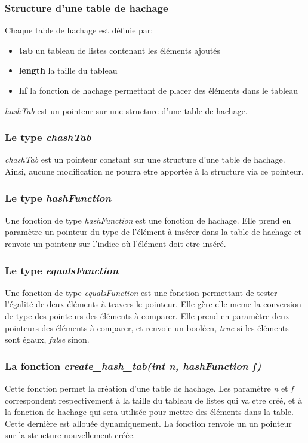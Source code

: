 \documentclass{report}
\begin{document}
\subsubsection*{Structure d'une table de hachage}
Chaque table de hachage est définie par:
\begin{itemize}
\item \textbf{tab} un tableau de listes contenant les éléments ajoutés
\item \textbf{length} la taille du tableau
\item \textbf{hf} la fonction de hachage permettant de placer des éléments dans le tableau
\end{itemize}
\textit{hashTab} est un pointeur sur une structure d'une table de hachage.
\subsubsection*{Le type \textit{chashTab}}
\textit{chashTab} est un pointeur constant sur une structure d'une table de hachage. Ainsi, aucune modification ne pourra etre apportée à la structure via ce pointeur.
\subsubsection*{Le type \textit{hashFunction}}
Une fonction de type \textit{hashFunction} est une fonction de hachage. Elle prend en paramètre un pointeur du type de l'élément à insérer dans la table de hachage et renvoie un pointeur sur l'indice où l'élément doit etre inséré.
\subsubsection*{Le type \textit{equalsFunction}}
Une fonction de type \textit{equalsFunction} est une fonction permettant de tester l'égalité de deux éléments à travers le pointeur. Elle gère elle-meme la conversion de type des pointeurs des éléments à comparer. Elle prend en paramètre deux pointeurs des éléments à comparer, et renvoie un booléen, \textit{true} si les éléments sont égaux, \textit{false} sinon.
\subsubsection*{La fonction \textit{create\_hash\_tab(int n, hashFunction f)}}
Cette fonction permet la création d'une table de hachage. Les paramètre \textit{n} et \textit{f} correspondent respectivement à la taille du tableau de listes qui va etre créé, et à la fonction de hachage qui sera utilisée pour mettre des éléments dans la table. Cette dernière est allouée dynamiquement. La fonction renvoie un un pointeur sur la structure nouvellement créée.
\end{document}
